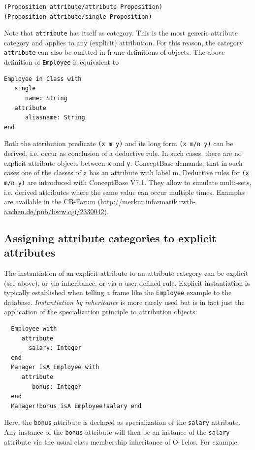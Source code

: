 \begin{verbatim}
(Proposition attribute/attribute Proposition)
(Proposition attribute/single Proposition)
\end{verbatim}

Note that {\tt attribute} has itself as category. This is the most generic attribute category and
applies to any (explicit) attribution. For this reason, the category {\tt attribute} can also be
omitted in frame definitions of objects. The above definition of {\tt Employee} is equivalent to

\begin{verbatim}
Employee in Class with
   single
      name: String
   attribute
      aliasname: String
end
\end{verbatim}

Both the attribution predicate {\tt (x m y)} and its long form {\tt (x m/n y)} can be derived,
i.e. occur as conclusion of a deductive rule. In such cases, there are no explicit attribute
objects between {\tt x}  and {\tt y}. ConceptBase demands, that in such cases one of the classes
of {\tt x}  has an attribute with label {m}. Deductive rules for {\tt (x m/n y)} are
introduced with ConceptBase V7.1. They allow to simulate multi-sets, i.e. derived attributes
where the same value can occur multiple times. 
Examples are available in the CB-Forum
(\url{http://merkur.informatik.rwth-aachen.de/pub/bscw.cgi/2330042}).

\subsection{Assigning attribute categories to explicit attributes}
\label{sec:aepred}

The instantiation of an explicit attribute to an attribute category can be explicit (see above), 
or via inheritance, or via a user-defined rule.  
Explicit instantiation is typically established when telling a frame
like the {\tt Employee} example to the database. {\em Instantiation by inheritance\/} is more rarely
used but is in fact just the application of the specialization principle to attribution objects:

\begin{verbatim}
  Employee with
     attribute
       salary: Integer
  end
  Manager isA Employee with
     attribute
        bonus: Integer
  end
  Manager!bonus isA Employee!salary end
\end{verbatim}


Here, the {\tt bonus}  attribute is declared as specialization of the {\tt salary} attribute. Any 
instance of the {\tt bonus} attribute will then be an instance of the {\tt salary} attribute via
the usual class membership inheritance of O-Telos.  For example,


